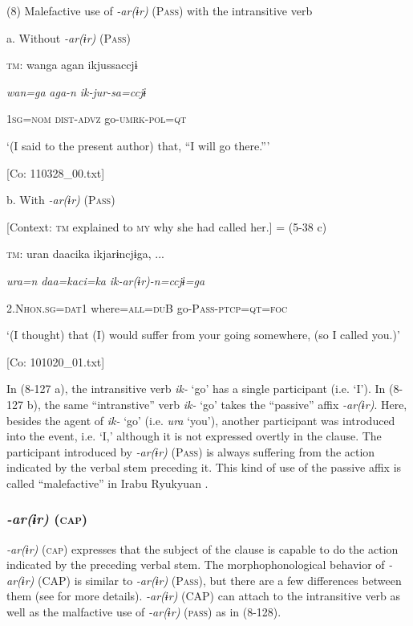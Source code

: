 (8)  Malefactive use of \textit{{}-ar(ɨr)} (P\textsc{ass}) with the intransitive verb

  a.  Without \textit{{}-ar(ɨr)} (P\textsc{ass})

    \textsc{tm}:  wanga  agan  ikjussaccjɨ

      \textit{wan=ga}  \textit{aga-n}  \textit{ik{}-jur-sa=ccjɨ}

      1\textsc{sg}=\textsc{nom}  \textsc{dist}-\textsc{advz}  go-\textsc{umrk}-\textsc{pol}=\textsc{qt}

      ‘(I said to the present author) that, “I will go there.”’

      [Co: 110328\_00.txt]

  b.  With \textit{{}-ar(ɨr)} (P\textsc{ass})

    [Context: \textsc{tm} explained to \textsc{my} why she had called her.] = (5-38 c)

    \textsc{tm}:  uran  daacika  ikjarɨncjɨga, ...

      \textit{ura=n}  \textit{daa=kaci=ka}  \textit{ik-ar(ɨr){}-n=ccjɨ=ga}

      2.N\textsc{hon}.\textsc{sg}=\textsc{dat}1  where=\textsc{all}=\textsc{du}B  go-P\textsc{ass}-\textsc{ptcp}=\textsc{qt}=\textsc{foc}

      ‘(I thought) that (I) would suffer from your going somewhere, (so I called you.)’

      [Co: 101020\_01.txt]

In (8-127 a), the intransitive verb \textit{ik-} ‘go’ has a single participant (i.e. ‘I’). In (8-127 b), the same “intranstive” verb \textit{ik-} ‘go’ takes the “passive” affix \textit{{}-ar(ɨr)}. Here, besides the agent of \textit{ik-} ‘go’ (i.e. \textit{ura} ‘you’), another participant was introduced into the event, i.e. ‘I,’ although it is not expressed overtly in the clause. The participant introduced by \textit{{}-ar(ɨr)} (P\textsc{ass}) is always suffering from the action indicated by the verbal stem preceding it. This kind of use of the passive affix is called “malefactive” in Irabu Ryukyuan \citep[493-498]{Shimoji2008}.

\subsubsection{\textit{{}-ar(ɨr)} (\textsc{cap})}
\label{bkm:Ref366851018}
\textit{{}-ar(ɨr)} (\textsc{cap}) expresses that the subject of the clause is capable to do the action indicated by the preceding verbal stem. The morphophonological behavior of \textit{{}-ar(ɨr)} (CAP) is similar to \textit{{}-ar(ɨr)} (P\textsc{ass}), but there are a few differences between them (see  for more details). \textit{{}-ar(ɨr)} (CAP) can attach to the intransitive verb as well as the malfactive use of \textit{{}-ar(ɨr)} (\textsc{pass}) as in (8-128).

